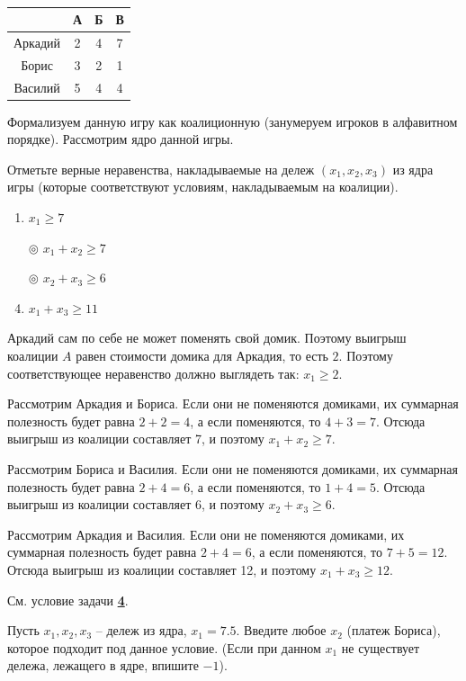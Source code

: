 	\begin{table}[h]
		\label{prob4:table1}
		\caption{}
		\centering
		\begin{tabular}{|c|c|c|c|}
			\hline & А & Б & В \\ 	
			\hline Аркадий & 2 & 4 & 7 \\ 
			\hline Борис & 3 & 2 & 1 \\ 
			\hline Василий & 5 & 4 & 4 \\ 
			\hline 
		\end{tabular} 
	\end{table}
	
	Формализуем данную игру как коалиционную (занумеруем игроков в алфавитном порядке). Рассмотрим ядро данной игры.
	
	Отметьте верные неравенства, накладываемые на дележ $(x_1,x_2,x_3)$ из ядра игры (которые соответствуют условиям, накладываемым на коалиции).
	
	\begin{enumerate}[label=$\circ$]
		\item $x_1 \geq 7$
		\item[$\circledcirc$] $x_1 + x_2 \geq 7$
		\item[$\circledcirc$] $x_2 + x_3 \geq 6$
		\item $x_1 + x_3 \geq 11$
	\end{enumerate}

	\solution
	\label{arkadiy:sol1}
	Аркадий сам по себе не может поменять свой домик. Поэтому выигрыш коалиции $A$ равен стоимости домика для Аркадия, то есть $2$. Поэтому соответствующее неравенство должно выглядеть так: $x_1 \geq 2$.
	
	Рассмотрим Аркадия и Бориса. Если они не поменяются домиками, их суммарная полезность будет равна $2+2=4$, а если поменяются, то $4+3=7$. Отсюда выигрыш из коалиции составляет 7, и поэтому $x_1+x_2 \geq 7$.
	
	Рассмотрим Бориса и Василия. Если они не поменяются домиками, их суммарная полезность будет равна $2+4=6$, а если поменяются, то $1+4=5$. Отсюда выигрыш из коалиции составляет 6, и поэтому $x_2+x_3 \geq 6$.
	
	Рассмотрим Аркадия и Василия. Если они не поменяются домиками, их суммарная полезность будет равна $2+4=6$, а если поменяются, то $7+5=12$. Отсюда выигрыш из коалиции составляет 12, и поэтому $x_1+x_3 \geq 12$.

	\task
	См. условие задачи \hyperref[sec4]{\textbf{4}}.
	
	Пусть $x_1,x_2,x_3$ -- дележ из ядра, $x_1 = 7.5$. Введите любое $x_2$ (платеж Бориса), которое подходит под данное условие. (Если при данном $x_1$ не существует дележа, лежащего в ядре, впишите $-1$).
	
